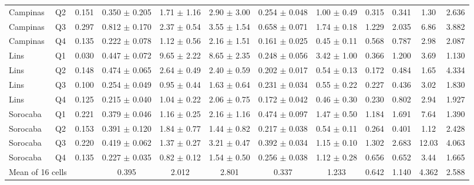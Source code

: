 \begin{table}[t]
{\begin{tabular}{ll c ccc cc c cc c}
Campinas & Q2 & 0.151 & 0.350 $\pm$ 0.205 & 1.71 $\pm$ 1.16 & 2.90 $\pm$ 3.00 & 0.254 $\pm$ 0.048 & 1.00 $\pm$ 0.49 & 0.315 & 0.341 & 1.30 & 2.636 \\
Campinas & Q3 & 0.297 & 0.812 $\pm$ 0.170 & 2.37 $\pm$ 0.54 & 3.55 $\pm$ 1.54 & 0.658 $\pm$ 0.071 & 1.74 $\pm$ 0.18 & 1.229 & 2.035 & 6.86 & 3.882 \\
Campinas & Q4 & 0.135 & 0.222 $\pm$ 0.078 & 1.12 $\pm$ 0.56 & 2.16 $\pm$ 1.51 & 0.161 $\pm$ 0.025 & 0.45 $\pm$ 0.11 & 0.568 & 0.787 & 2.98 & 2.087 \\
Lins & Q1 & 0.030 & 0.447 $\pm$ 0.072 & 9.65 $\pm$ 2.22 & 8.65 $\pm$ 2.35 & 0.248 $\pm$ 0.056 & 3.42 $\pm$ 1.00 & 0.366 & 1.200 & 3.69 & 1.130 \\
Lins & Q2 & 0.148 & 0.474 $\pm$ 0.065 & 2.64 $\pm$ 0.49 & 2.40 $\pm$ 0.59 & 0.202 $\pm$ 0.017 & 0.54 $\pm$ 0.13 & 0.172 & 0.484 & 1.65 & 4.334 \\
Lins & Q3 & 0.100 & 0.254 $\pm$ 0.049 & 0.95 $\pm$ 0.44 & 1.63 $\pm$ 0.64 & 0.231 $\pm$ 0.034 & 0.55 $\pm$ 0.22 & 0.227 & 0.436 & 3.02 & 1.830 \\
Lins & Q4 & 0.125 & 0.215 $\pm$ 0.040 & 1.04 $\pm$ 0.22 & 2.06 $\pm$ 0.75 & 0.172 $\pm$ 0.042 & 0.46 $\pm$ 0.30 & 0.230 & 0.802 & 2.94 & 1.927 \\
Sorocaba & Q1 & 0.221 & 0.379 $\pm$ 0.046 & 1.16 $\pm$ 0.25 & 2.16 $\pm$ 1.16 & 0.474 $\pm$ 0.097 & 1.47 $\pm$ 0.50 & 1.184 & 1.691 & 7.64 & 1.390 \\
Sorocaba & Q2 & 0.153 & 0.391 $\pm$ 0.120 & 1.84 $\pm$ 0.77 & 1.44 $\pm$ 0.82 & 0.217 $\pm$ 0.038 & 0.54 $\pm$ 0.11 & 0.264 & 0.401 & 1.12 & 2.428 \\
Sorocaba & Q3 & 0.220 & 0.419 $\pm$ 0.062 & 1.37 $\pm$ 0.27 & 3.21 $\pm$ 0.47 & 0.392 $\pm$ 0.034 & 1.15 $\pm$ 0.10 & 1.302 & 2.683 & 12.03 & 4.063 \\
Sorocaba & Q4 & 0.135 & 0.227 $\pm$ 0.035 & 0.82 $\pm$ 0.12 & 1.54 $\pm$ 0.50 & 0.256 $\pm$ 0.038 & 1.12 $\pm$ 0.28 & 0.656 & 0.652 & 3.44 & 1.665 \\
\midrule
\multicolumn{2}{l}{Mean of 16 cells} &  & 0.395 & 2.012 & 2.801 & 0.337 & 1.233 & 0.642 & 1.140 & 4.362 & 2.588 \\
\bottomrule
\end{tabular}%
}
\end{table}
